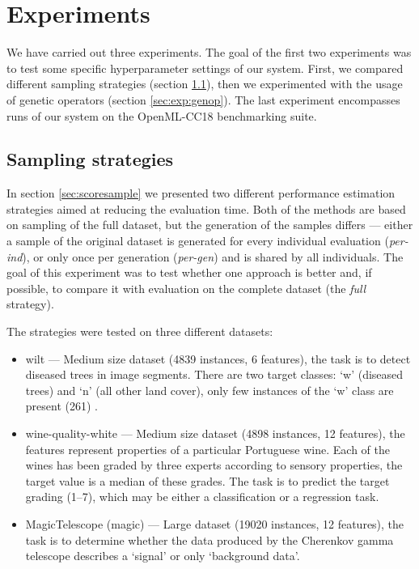 \chapter{Experiments} \label{experiments}
We have carried out three experiments. The goal of the first two experiments was
to test some specific hyperparameter settings of our system. First, we compared
different sampling strategies (section \ref{sec:exp:sample}), then we
experimented with the usage of genetic operators (section \ref{sec:exp:genop}).
The last experiment encompasses runs of our system on the OpenML-CC18 benchmarking
suite.

\section{Sampling strategies} \label{sec:exp:sample}
In section \ref{sec:scoresample} we presented two different performance
estimation strategies aimed at reducing the evaluation time. Both of the methods
are based on sampling of the full dataset, but the generation of the samples
differs --- either a sample of the original dataset is generated for every
individual evaluation (\emph{per-ind}), or only once per generation
(\emph{per-gen}) and is shared by all individuals. The goal of this experiment
was to test whether one approach is better and, if possible, to compare it with
evaluation on the complete dataset (the \emph{full} strategy).

The strategies were tested on three different datasets:
\begin{itemize}
\item wilt --- Medium size dataset (4839 instances, 6 features), the task is to
detect diseased trees in image segments. There are two target classes: `w' (diseased
trees) and `n' (all other land cover), only few instances of the `w' class
are present (261) \citep{doi:10.1080/01431161.2013.810825}.
\item wine-quality-white --- Medium size dataset (4898 instances, 12 features),
the features represent properties of a particular Portuguese wine. Each of the
wines has been graded by three experts according to sensory properties, the
target value is a median of these grades. The task is to predict the target
grading (1--7), which may be either a classification or a regression task.
\citep{CORTEZ2009547}
\item MagicTelescope (magic) --- Large dataset (19020 instances, 12 features), the task
is to determine whether the data produced by the Cherenkov gamma telescope
describes a `signal' or only `background data'. \citep{BOCK2004511}
\end{itemize}

